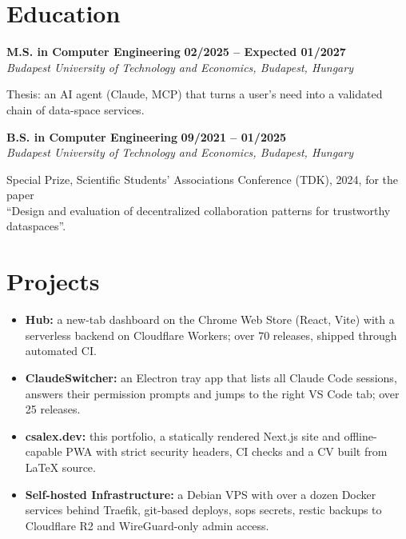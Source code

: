 \documentclass[10pt, a4paper]{article}
\newcommand{\cventry}[3]{
    {\large\bfseries\color{AccentColor}#1}
    \hfill
    {\large\bfseries\color{AccentColor}#3} \\
    \textit{#2}
    \vspace{2pt}
}
\begin{document}
\section*{Education}

\cventry{M.S. in Computer Engineering}{Budapest University of Technology and Economics, Budapest, Hungary}{02/2025 – Expected 01/2027}

\vspace{0.5ex}
Thesis: an AI agent (Claude, MCP) that turns a user's need into a validated chain of data-space services.
\vspace{1.2ex} %

\cventry{B.S. in Computer Engineering}{Budapest University of Technology and Economics, Budapest, Hungary}{09/2021 – 01/2025}

\vspace{0.5ex}
Special Prize, Scientific Students' Associations Conference (TDK), 2024, for the paper \\
``Design and evaluation of decentralized collaboration patterns for trustworthy dataspaces''.

\section*{Projects}

\begin{itemize}
    \item \textbf{\color{AccentColor}Hub:} a new-tab dashboard on the Chrome Web Store (React, Vite) with a serverless backend on Cloudflare Workers; over 70 releases, shipped through automated CI.
    \item \textbf{\color{AccentColor}ClaudeSwitcher:} an Electron tray app that lists all Claude Code sessions, answers their permission prompts and jumps to the right VS Code tab; over 25 releases.
    \item \textbf{\color{AccentColor}csalex.dev:} this portfolio, a statically rendered Next.js site and offline-capable PWA with strict security headers, CI checks and a CV built from LaTeX source.
    \item \textbf{\color{AccentColor}Self-hosted Infrastructure:} a Debian VPS with over a dozen Docker services behind Traefik, git-based deploys, sops secrets, restic backups to Cloudflare R2 and WireGuard-only admin access.
\end{itemize}
\end{document}
